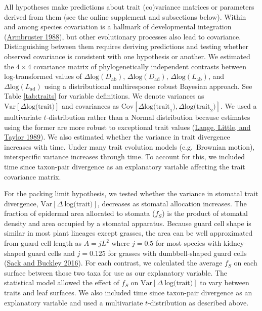 \documentclass[
  12pt,
]{article}
\begin{document}
All hypotheses make predictions about trait (co)variance matrices or parameters derived from them (see the online supplement and subsections below). Within and among species covariation is a hallmark of developmental integration (\protect\hyperlink{ref-armbruster_multilevel_1988}{Armbruster 1988}), but other evolutionary processes also lead to covariance. Distinguishing between them requires deriving predictions and testing whether observed covariance is consistent with one hypothesis or another. We estimated the \(4 \times 4\) covariance matrix of phylogenetically independent contrasts between log-transformed values of \(\Delta \text{log}(D_\mathrm{ab})\), \(\Delta \text{log}(D_\mathrm{ad})\), \(\Delta \text{log}(L_\mathrm{ab})\), and \(\Delta \text{log}(L_\mathrm{ad})\) using a distributional multiresponse robust Bayesian approach. See Table \ref{tab:traits} for variable definitions. We denote variances as \(\text{Var}[\Delta \text{log(trait)}]\) and covariances as \(\text{Cov}[\Delta \text{log(trait}_1),\Delta \text{log(trait}_2)]\). We used a multivariate \(t\)-distribution rather than a Normal distribution because estimates using the former are more robust to exceptional trait values (\protect\hyperlink{ref-lange_robust_1989}{Lange, Little, and Taylor 1989}). We also estimated whether the variance in trait divergence increases with time. Under many trait evolution models (e.g.~Brownian motion), interspecific variance increases through time. To account for this, we included time since taxon-pair divergence as an explanatory variable affecting the trait covariance matrix.

For the packing limit hypothesis, we tested whether the variance in stomatal trait divergence, \(\textrm{Var}[\Delta~\textrm{log(trait)}]\), decreases as stomatal allocation increases. The fraction of epidermal area allocated to stomata (\(f_S\)) is the product of stomatal density and area occupied by a stomatal apparatus. Because guard cell shape is similar in most plant lineages except grasses, the area can be well approximated from guard cell length as \(A = j L ^ 2\) where \(j = 0.5\) for most species with kidney-shaped guard cells and \(j = 0.125\) for grasses with dumbbell-shaped guard cells (\protect\hyperlink{ref-sack_developmental_2016}{Sack and Buckley 2016}). For each contrast, we calculated the average \(f_S\) on each surface between those two taxa for use as our explanatory variable. The statistical model allowed the effect of \(f_S\) on \(\textrm{Var}[\Delta~\textrm{log(trait)}]\) to vary between traits and leaf surfaces. We also included time since taxon-pair divergence as an explanatory variable and used a multivariate \(t\)-distribution as described above.
\end{document}
